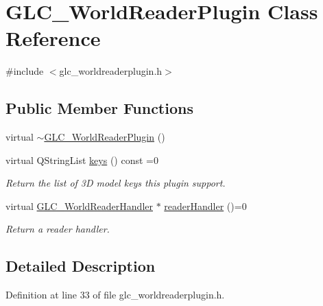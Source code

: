 \hypertarget{class_g_l_c___world_reader_plugin}{\section{G\-L\-C\-\_\-\-World\-Reader\-Plugin Class Reference}
\label{class_g_l_c___world_reader_plugin}
}


{\ttfamily \#include $<$glc\-\_\-worldreaderplugin.\-h$>$}

\subsection*{Public Member Functions}
\begin{DoxyCompactItemize}
\item 
virtual \hyperlink{class_g_l_c___world_reader_plugin_ab4e9a5412b20537ae7a72afbe3d8e1d0}{$\sim$\-G\-L\-C\-\_\-\-World\-Reader\-Plugin} ()
\item 
virtual Q\-String\-List \hyperlink{class_g_l_c___world_reader_plugin_aea9f2bfee85895c4bab707baab190887}{keys} () const =0
\begin{DoxyCompactList}\small\item\em Return the list of 3\-D model keys this plugin support. \end{DoxyCompactList}\item 
virtual \hyperlink{class_g_l_c___world_reader_handler}{G\-L\-C\-\_\-\-World\-Reader\-Handler} $\ast$ \hyperlink{class_g_l_c___world_reader_plugin_a4c794fa3245e05810d32a7edfb65ee02}{reader\-Handler} ()=0
\begin{DoxyCompactList}\small\item\em Return a reader handler. \end{DoxyCompactList}\end{DoxyCompactItemize}


\subsection{Detailed Description}


Definition at line 33 of file glc\-\_\-worldreaderplugin.\-h.



